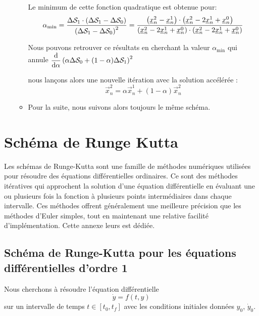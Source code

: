 \documentclass[10pt]{book}
\begin{document}
\begin{appendices}
\begin{itemize}
\begin{itemize}
$$\begin{aligned}
\end{aligned}$$
Le minimum de cette fonction quadratique est obtenue pour:
$$\alpha_{\min}=\dfrac{\Delta\mathcal{S}_{1}\cdot\left(\Delta\mathcal{S}_{1}-\Delta\mathcal{S}_{0}\right)}{\left(\Delta\mathcal{S}_{1}-\Delta\mathcal{S}_{0}\right)^{2}}=\dfrac{\left(\underline{x}_{n}^{2}-\underline{x}_{n}^{1}\right)\cdot\left(\underline{x}_{n}^{2}-2\underline{x}_{n}^{1}+\underline{x}_{n}^{0}\right)}{\left(\underline{x}_{n}^{2}-2\underline{x}_{n}^{1}+\underline{x}_{n}^{0}\right)\cdot \left(\underline{x}_{n}^{2}-2\underline{x}_{n}^{1}+\underline{x}_{n}^{0}\right)}$$
\begin{Rem}{Nous pouvons retrouver ce résultats en cherchant la valeur $\alpha_{\min}$ qui annule $\dfrac{\mathrm{d}}{\mathrm{d}\alpha}\left(\alpha\Delta\mathcal{S}_{0}+(1-\alpha)\Delta\mathcal{S}_{1}\right)^{2}$}\end{Rem}
nous lançons alors une nouvelle itération avec la solution \og accélérée \fg{}:
$$\vec{x}_{n}^{2}=\alpha \vec{x}_{n}^{1}+(1-\alpha)\vec{x}_{n}^{2}$$ 
\item Pour la suite, nous suivons alors toujours le même schéma.
\end{itemize}
\end{itemize}

\chapter{Schéma de Runge Kutta}
Les schémas de Runge-Kutta sont une famille de méthodes numériques utilisées pour résoudre des équations différentielles ordinaires. Ce sont des méthodes itératives qui approchent la solution d'une équation différentielle en évaluant une ou plusieurs fois la fonction à plusieurs points intermédiaires dans chaque intervalle. Ces méthodes offrent généralement une meilleure précision que les méthodes d'Euler simples, tout en maintenant une relative facilité d'implémentation. Cette annexe leurs est dédiée.
\section{Schéma de Runge-Kutta pour les équations différentielles d'ordre 1}
Nous cherchons à résoudre l'équation différentielle 
\begin{equation}
\dot{y} = f(t,y)
\label{eq:EDO_ordre_1}
\end{equation}
sur un intervalle de temps $t\in[t_{0},t_{f}]$ avec les conditions initiales données $y_{0}$, $\dot{y}_{0}$.

\end{appendices}
\end{document}
